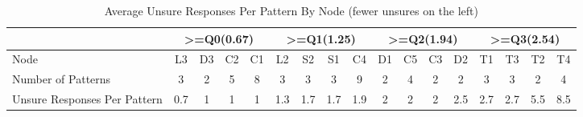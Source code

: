 \begin{table*}
\centering
\caption{Average Unsure Responses Per Pattern By Node (fewer unsures on the left)}\label{table:unsureResults}
\begin{tabular}{|| l || cccc || cccc || || cccc || cccc ||}
               & \multicolumn{4}{c||}{>=Q0(0.67)}         & \multicolumn{4}{c||||}{>=Q1(1.25)}   & \multicolumn{4}{c||}{>=Q2(1.94)}    &  \multicolumn{4}{c||}{>=Q3(2.54)}  \\ \hline
Node     & L3 & D3 & C2 & C1 & L2 & S2 & S1 & C4 & D1 & C5 & C3 & D2 & T1 & T3 & T2 & T4 \\
Number of Patterns & 3 & 2 & 5 & 8 & 3 & 3 & 3 & 9 & 2 & 4 & 2 & 2 & 3 & 3 & 2 & 4\\
Unsure Responses Per Pattern & 0.7 & 1 & 1 & 1 & 1.3 & 1.7 & 1.7 & 1.9 & 2 & 2 & 2 & 2.5 & 2.7 & 2.7 & 5.5 & 8.5\\
\end{tabular}
\end{table*}
